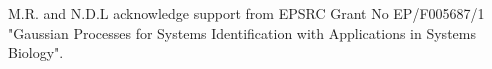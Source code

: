 \documentclass{pnastwo}
\begin{document}
\begin{article}
\begin{materials}

\end{materials}

\begin{acknowledgments}
M.R. and N.D.L acknowledge support from EPSRC Grant No EP/F005687/1 "Gaussian Processes for Systems Identification with Applications in Systems Biology". 
\end{acknowledgments}




%
\end{article}

\end{document}
